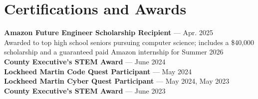 \documentclass[letterpaper,11pt]{article}
\begin{document}
\section{Certifications and Awards}
\begin{itemize}[leftmargin=0.15in, label={}]
  \small{\item{
    \textbf{Amazon Future Engineer Scholarship Recipient} — Apr. 2025 \\
    Awarded to top high school seniors pursuing computer science; includes a \$40,000 scholarship and a guaranteed paid Amazon internship for Summer 2026 \\
    \textbf{County Executive's STEM Award} — June 2024 \\
    \textbf{Lockheed Martin Code Quest Participant} — May 2024 \\
    \textbf{Lockheed Martin Cyber Quest Participant} — May 2024, May 2023 \\
    \textbf{County Executive's STEM Award} — June 2023 \\
  }}
\end{itemize}

\end{document}
